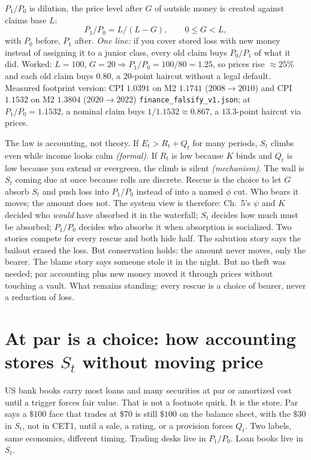 $P_1/P_0$ is dilution, the price level after $G$ of outside money is created against claims base $L$:
\begin{equation}
P_1/P_0 = L/(L-G),\qquad 0\le G<L,
\label{eq:P6}
\end{equation}
with $P_0$ before, $P_1$ after. \textit{One line:} if you cover stored loss with new money instead of assigning it to a junior class, every old claim buys $P_0/P_1$ of what it did. Worked: $L=100$, $G=20\Rightarrow P_1/P_0=100/80=1.25$, so prices rise $\approx25\%$ and each old claim buys $0.80$, a $20$-point haircut without a legal default. Measured footprint version: CPI $1.0391$ on M2 $1.1741$ ($2008\to2010$) and CPI $1.1532$ on M2 $1.3804$ ($2020\to2022$) \texttt{finance\_falsify\_v1.json}; at $P_1/P_0=1.1532$, a nominal claim buys $1/1.1532\approx0.867$, a $13.3$-point haircut via prices.

The law is accounting, not theory. If $E_t>R_t+Q_t$ for many periods, $S_t$ climbs even while income looks calm \textit{(formal)}. If $R_t$ is low because $K$ binds and $Q_t$ is low because you extend or evergreen, the climb is silent \textit{(mechanism)}. The wall is $S_t$ coming due at once because rolls are discrete. Rescue is the choice to let $G$ absorb $S_t$ and push loss into $P_1/P_0$ instead of into a named $\phi$ cut. Who bears it moves; the amount does not. The system view is therefore: Ch.~5's $\psi$ and $K$ decided who \textit{would} have absorbed it in the waterfall; $S_t$ decides how much must be absorbed; $P_1/P_0$ decides who absorbs it when absorption is socialized. Two stories compete for every rescue and both hide half. The salvation story says the bailout erased the loss. But conservation holds: the amount never moves, only the bearer. The blame story says someone stole it in the night. But no theft was needed; par accounting plus new money moved it through prices without touching a vault. What remains standing: every rescue is a choice of bearer, never a reduction of loss.

\section{At par is a choice: how accounting stores $S_t$ without moving price}
\label{sec:par}

US bank books carry most loans and many securities at par or amortized cost until a trigger forces fair value. That is not a footnote quirk. It is the store. Par says a $\$100$ face that trades at $\$70$ is still $\$100$ on the balance sheet, with the $\$30$ in $S_t$, not in CET1, until a sale, a rating, or a provision forces $Q_t$. Two labels, same economics, different timing. Trading desks live in $P_1/P_0$. Loan books live in $S_t$.

